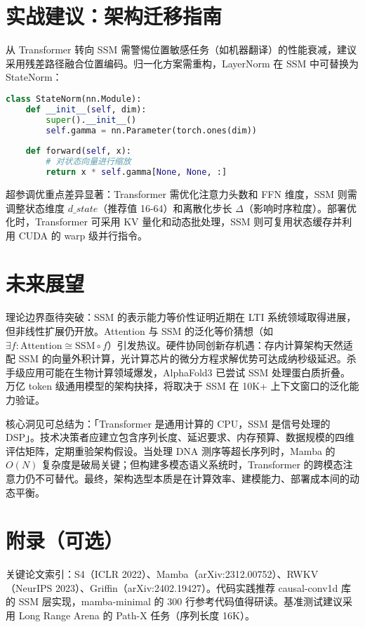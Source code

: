 \chapter{实战建议：架构迁移指南}
从 Transformer 转向 SSM 需警惕位置敏感任务（如机器翻译）的性能衰减，建议采用残差路径融合位置编码。归一化方案需重构，LayerNorm 在 SSM 中可替换为 StateNorm：\par
\begin{lstlisting}[language=python]
class StateNorm(nn.Module):
    def __init__(self, dim):
        super().__init__()
        self.gamma = nn.Parameter(torch.ones(dim))
        
    def forward(self, x):
        # 对状态向量进行缩放
        return x * self.gamma[None, None, :]  
\end{lstlisting}
超参调优重点差异显著：Transformer 需优化注意力头数和 FFN 维度，SSM 则需调整状态维度 $d\_state$（推荐值 16-64）和离散化步长 $\Delta$（影响时序粒度）。部署优化时，Transformer 可采用 KV 量化和动态批处理，SSM 则可复用状态缓存并利用 CUDA 的 warp 级并行指令。\par
\chapter{未来展望}
理论边界亟待突破：SSM 的表示能力等价性证明近期在 LTI 系统领域取得进展，但非线性扩展仍开放。Attention 与 SSM 的泛化等价猜想（如 $\exists f: \text{Attention} \cong \text{SSM} \circ f$）引发热议。硬件协同创新存机遇：存内计算架构天然适配 SSM 的向量外积计算，光计算芯片的微分方程求解优势可达成纳秒级延迟。杀手级应用可能在生物计算领域爆发，AlphaFold3 已尝试 SSM 处理蛋白质折叠。万亿 token 级通用模型的架构抉择，将取决于 SSM 在 10K+ 上下文窗口的泛化能力验证。\par
核心洞见可总结为：「Transformer 是通用计算的 CPU，SSM 是信号处理的 DSP」。技术决策者应建立包含序列长度、延迟要求、内存预算、数据规模的四维评估矩阵，定期重验架构假设。当处理 DNA 测序等超长序列时，Mamba 的 $O(N)$ 复杂度是破局关键；但构建多模态语义系统时，Transformer 的跨模态注意力仍不可替代。最终，架构选型本质是在计算效率、建模能力、部署成本间的动态平衡。\par
\chapter{附录（可选）}
关键论文索引：S4（ICLR 2022）、Mamba（arXiv:2312.00752）、RWKV（NeurIPS 2023）、Griffin（arXiv:2402.19427）。代码实践推荐 causal-conv1d 库的 SSM 层实现，mamba-minimal 的 300 行参考代码值得研读。基准测试建议采用 Long Range Arena 的 Path-X 任务（序列长度 16K）。\par
